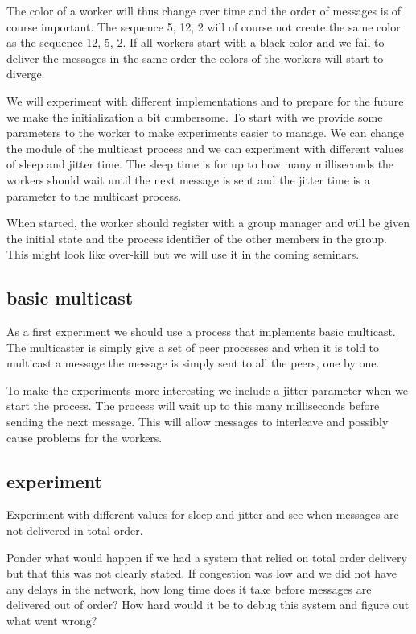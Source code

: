 \documentclass[a4paper,11pt]{article}
\begin{document}
The color of a worker will thus change over time and the order of
messages is of course important. The sequence 5, 12, 2 will of course
not create the same color as the sequence 12, 5, 2. If all workers
start with a black color and we fail to deliver the messages in the
same order the colors of the workers will start to diverge.

We will experiment with different implementations and to prepare for
the future we make the initialization a bit cumbersome. To start with
we provide some parameters to the worker to make experiments easier to
manage. We can change the module of the multicast process and we can
experiment with different values of sleep and jitter time. The sleep
time is for up to how many milliseconds the workers should wait
until the next message is sent and the jitter time is a parameter to
the multicast process.

When started, the worker should register with a group manager and will
be given the initial state and the process identifier of the other
members in the group. This might look like over-kill but we will use
it in the coming seminars.


\subsection{basic multicast}

As a first experiment we should use a process that implements basic
multicast. The multicaster is simply give a set of peer processes and
when it is told to multicast a message the message is simply sent to
all the peers, one by one. 

To make the experiments more interesting we include a jitter parameter
when we start the process. The process will wait up to this many
milliseconds before sending the next message. This will allow messages
to interleave and possibly cause problems for the workers.

\subsection{experiment}

Experiment with different values for sleep and jitter and see
when messages are not delivered in total order.

Ponder what would happen if we had a system that relied on total order
delivery but that this was not clearly stated. If congestion was low
and we did not have any delays in the network, how long time does it
take before messages are delivered out of order? How hard would it be
to debug this system and figure out what went wrong?
\end{document}

